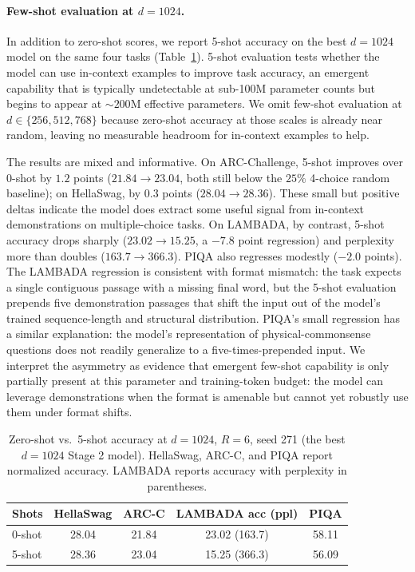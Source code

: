 \documentclass{article}
\begin{document}
\paragraph{Few-shot evaluation at $d{=}1024$.}
In addition to zero-shot scores, we report 5-shot accuracy on the best $d{=}1024$ model on the same four tasks (Table~\ref{tab:fewshot}). 5-shot evaluation tests whether the model can use in-context examples to improve task accuracy, an emergent capability that is typically undetectable at sub-100M parameter counts but begins to appear at $\sim 200$M effective parameters. We omit few-shot evaluation at $d \in \{256, 512, 768\}$ because zero-shot accuracy at those scales is already near random, leaving no measurable headroom for in-context examples to help.

The results are mixed and informative. On ARC-Challenge, 5-shot improves over 0-shot by $1.2$ points ($21.84 \to 23.04$, both still below the $25\%$ 4-choice random baseline); on HellaSwag, by $0.3$ points ($28.04 \to 28.36$). These small but positive deltas indicate the model does extract some useful signal from in-context demonstrations on multiple-choice tasks. On LAMBADA, by contrast, 5-shot accuracy drops sharply ($23.02 \to 15.25$, a $-7.8$ point regression) and perplexity more than doubles ($163.7 \to 366.3$). PIQA also regresses modestly ($-2.0$ points). The LAMBADA regression is consistent with format mismatch: the task expects a single contiguous passage with a missing final word, but the 5-shot evaluation prepends five demonstration passages that shift the input out of the model's trained sequence-length and structural distribution. PIQA's small regression has a similar explanation: the model's representation of physical-commonsense questions does not readily generalize to a five-times-prepended input. We interpret the asymmetry as evidence that emergent few-shot capability is only partially present at this parameter and training-token budget: the model can leverage demonstrations when the format is amenable but cannot yet robustly use them under format shifts.

\begin{table}[htbp]
\centering
\caption{Zero-shot vs.\ 5-shot accuracy at $d{=}1024$, $R{=}6$, seed 271 (the best $d{=}1024$ Stage 2 model). HellaSwag, ARC-C, and PIQA report normalized accuracy. LAMBADA reports accuracy with perplexity in parentheses.}
\label{tab:fewshot}
\footnotesize
\begin{tabular}{lcccc}
\toprule
Shots & HellaSwag & ARC-C & LAMBADA acc (ppl) & PIQA \\
\midrule
0-shot & 28.04 & 21.84 & 23.02 (163.7) & 58.11 \\
5-shot & 28.36 & 23.04 & 15.25 (366.3) & 56.09 \\
\bottomrule
\end{tabular}
\end{table}
\end{document}
